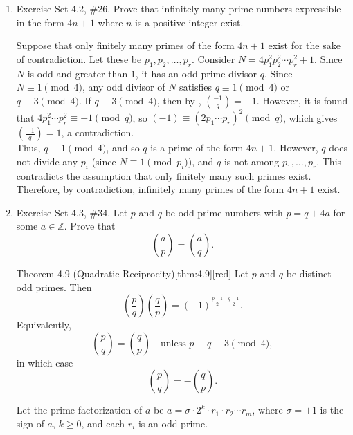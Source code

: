 \begin{enumerate}
  \newpage
  \item Exercise Set 4.2, \#26. Prove that infinitely many prime numbers expressible in the form $4 n+1$ where $n$ is a positive integer exist. 
  \begin{subprove}
    Suppose that only finitely many primes of the form $4n+1$ exist for the sake of contradiction. 
    Let these be $p_1, p_2, \ldots, p_r$. Consider $N = 4p_1^2p_2^2\cdots p_r^2 + 1$.
    Since $N$ is odd and greater than $1$, it has an odd prime divisor $q$. Since $N\equiv 1\pmod{4}$, 
    any odd divisor of $N$ satisfies $q\equiv 1\pmod{4}$ or $q\equiv 3\pmod{4}$.
    If $q\equiv 3\pmod{4}$, then by , $\left(\frac{-1}{q}\right) = -1$. 
    However, it is found that $4p_1^2\cdots p_r^2 \equiv -1\pmod{q}$, 
    so $(-1)\equiv (2p_1\cdots p_r)^2\pmod{q}$, 
    which gives $\left(\frac{-1}{q}\right) = 1$, a contradiction.\vspace*{10px}\\
    Thus, $q\equiv 1\pmod{4}$, and so $q$ is a prime of the form $4n+1$. 
    However, $q$ does not divide any $p_i$ (since $N\equiv 1\pmod{p_i}$), and 
    $q$ is not among $p_1, \ldots, p_r$. This contradicts the assumption 
    that only finitely many such primes exist.\vspace*{10px}\\
    Therefore, by contradiction, infinitely many 
    primes of the form $4n+1$ exist.
  \end{subprove}
  \item Exercise Set 4.3, \#34. Let $p$ and $q$ be odd prime numbers with 
  $p=q+4 a$ for some $a \in \mathbb{Z}$. Prove that
  $$
  \left(\frac{a}{p}\right)=\left(\frac{a}{q}\right).
  $$
  \begin{define}{Theorem 4.9 (Quadratic Reciprocity)}[thm:4.9][red]
  Let $p$ and $q$ be distinct odd primes. Then
  \[
  \left(\frac{p}{q}\right)\left(\frac{q}{p}\right)=(-1)^{\frac{p-1}{2}\cdot\frac{q-1}{2}}.
  \]
  Equivalently,
  \[
  \left(\frac{p}{q}\right)=\left(\frac{q}{p}\right)\quad\text{unless }p\equiv q\equiv 3\pmod 4,
  \]
  in which case
  \[
  \left(\frac{p}{q}\right)=-\left(\frac{q}{p}\right).
  \]
  \end{define}
  \begin{subprove}
    Let the prime factorization of $a$ be $a = \sigma \cdot 2^k \cdot r_1 \cdot r_2 \cdots r_m$, where $\sigma = \pm 1$ is the sign of $a$, $k \ge 0$, and each $r_i$ is an odd prime.


\end{subprove}
\end{enumerate}

